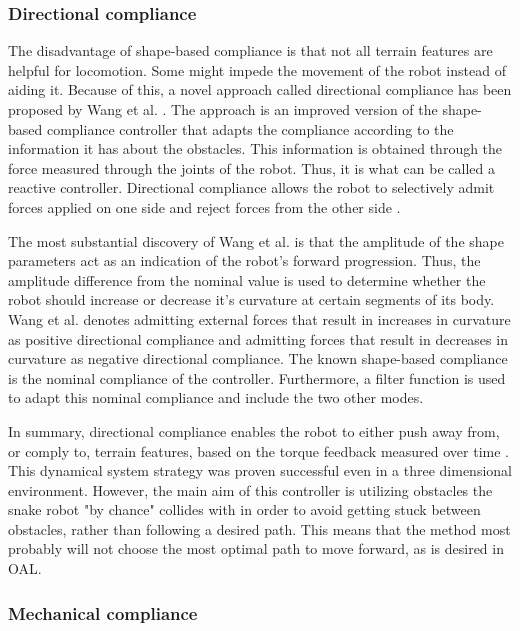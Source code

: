 \subsubsection{Directional compliance}

The disadvantage of shape-based compliance is that not all terrain features are helpful for locomotion. Some might impede the movement of the robot instead of aiding it. Because of this, a novel approach called directional compliance has been proposed by Wang et al. \cite{wang2020directional}. The approach is an improved version of the shape-based compliance controller that adapts the compliance according to the information it has about the obstacles. This information is obtained through the force measured through the joints of the robot. Thus, it is what can be called a reactive controller. Directional compliance allows the robot to selectively admit forces applied on one side and reject forces from the other side \cite{wang2020directional}.

The most substantial discovery of Wang et al. \cite{wang2020directional} is that the amplitude of the shape parameters act as an indication of the robot's forward progression. Thus, the amplitude difference from the nominal value is used to determine whether the robot should increase or decrease it's curvature at certain segments of its body. Wang et al. \cite{wang2020directional} denotes admitting external forces that result in increases in curvature as positive directional compliance and admitting forces that result in decreases in curvature as negative directional compliance. The known shape-based compliance is the nominal compliance of the controller. Furthermore, a filter function is used to adapt this nominal compliance and include the two other modes.

In summary, directional compliance enables the robot to either push away from, or comply to, terrain features, based on the torque feedback measured over time \cite{wang2020directional}. This dynamical system strategy was proven successful even in a three dimensional environment. However, the main aim of this controller is utilizing obstacles the snake robot "by chance" collides with in order to avoid getting stuck between obstacles, rather than following a desired path. This means that the method most probably will not choose the most optimal path to move forward, as is desired in OAL.


\subsubsection{Mechanical compliance}

